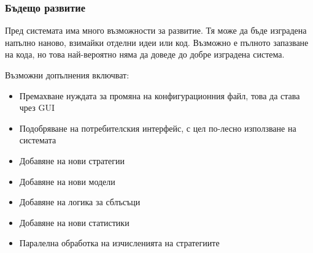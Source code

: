 \subsubsection{Бъдещо развитие}
	Пред системата има много възможности за развитие. Тя може да бъде изградена напълно наново, взимайки отделни идеи
	или код. Възможно е пълното запазване на кода, но това най-вероятно няма да доведе до добре изградена
	система.
	
	Възможни допълнения включват:
	
	\begin{itemize}
		\item Премахване нуждата за промяна на конфигурационния файл, това да става чрез \ac{GUI}
		\item Подобряване на потребителския интерфейс, с цел по-лесно използване на системата
		\item Добавяне на нови стратегии
		\item Добавяне на нови модели
		\item Добавяне на логика за сблъсъци
		\item Добавяне на нови статистики
		\item Паралелна обработка на изчисленията на стратегиите 
	\end{itemize}
